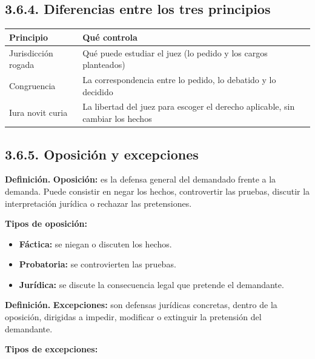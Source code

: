 \subsection{3.6.4. Diferencias entre los tres principios}
\begin{tabla}
\begin{longtable}{|>{\raggedright\arraybackslash}m{}|>{\raggedright\arraybackslash}m{}|}
\hline
\cellcolor[HTML]{1F3864}\textcolor[HTML]{FFFFFF}{\textbf{Principio}} & \cellcolor[HTML]{1F3864}\textcolor[HTML]{FFFFFF}{\textbf{Qué controla}} \\ \hline
Jurisdicción rogada & Qué puede estudiar el juez (lo pedido y los cargos planteados) \\ \hline
\cellcolor[HTML]{F2F5FA}Congruencia & \cellcolor[HTML]{F2F5FA}La correspondencia entre lo pedido, lo debatido y lo decidido \\ \hline
Iura novit curia & La libertad del juez para escoger el derecho aplicable, sin cambiar los hechos \\ \hline
\end{longtable}
\end{tabla}
\subsection{3.6.5. Oposición y excepciones}
\begin{definicion}
\textcolor[HTML]{1F3864}{\textbf{Definición. }}\textbf{Oposición: }es la defensa general del demandado frente a la demanda. Puede consistir en negar los hechos, controvertir las pruebas, discutir la interpretación jurídica o rechazar las pretensiones.
\end{definicion}
\textbf{Tipos de oposición:}

\begin{itemize}
\item \textbf{Fáctica:} se niegan o discuten los hechos.
\item \textbf{Probatoria:} se controvierten las pruebas.
\item \textbf{Jurídica:} se discute la consecuencia legal que pretende el demandante.
\end{itemize}
\begin{definicion}
\textcolor[HTML]{1F3864}{\textbf{Definición. }}\textbf{Excepciones: }son defensas jurídicas concretas, dentro de la oposición, dirigidas a impedir, modificar o extinguir la pretensión del demandante.
\end{definicion}
\textbf{Tipos de excepciones:}

